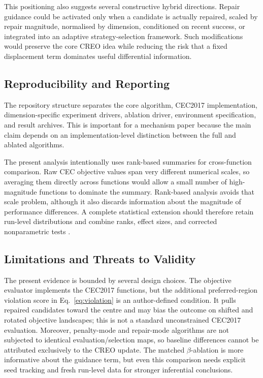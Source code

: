 \documentclass[journal]{IEEEtran}
\begin{document}
This positioning also suggests several constructive hybrid directions. Repair guidance could be activated only when a candidate is actually repaired, scaled by repair magnitude, normalised by dimension, conditioned on recent success, or integrated into an adaptive strategy-selection framework. Such modifications would preserve the core CREO idea while reducing the risk that a fixed displacement term dominates useful differential information.

\subsection{Reproducibility and Reporting}

The repository structure separates the core algorithm, CEC2017 implementation, dimension-specific experiment drivers, ablation driver, environment specification, and result archives. This is important for a mechanism paper because the main claim depends on an implementation-level distinction between the full and ablated algorithms.

The present analysis intentionally uses rank-based summaries for cross-function comparison. Raw CEC objective values span very different numerical scales, so averaging them directly across functions would allow a small number of high-magnitude functions to dominate the summary. Rank-based analysis avoids that scale problem, although it also discards information about the magnitude of performance differences. A complete statistical extension should therefore retain run-level distributions and combine ranks, effect sizes, and corrected nonparametric tests \cite{garcia2009nonparametric,derrac2011tutorial}.

\subsection{Limitations and Threats to Validity}

The present evidence is bounded by several design choices. The objective evaluator implements the CEC2017 functions, but the additional preferred-region violation score in Eq.~\eqref{eq:violation} is an author-defined condition. It pulls repaired candidates toward the centre and may bias the outcome on shifted and rotated objective landscapes; this is not a standard unconstrained CEC2017 evaluation. Moreover, penalty-mode and repair-mode algorithms are not subjected to identical evaluation/selection maps, so baseline differences cannot be attributed exclusively to the CREO update. The matched $\beta$-ablation is more informative about the guidance term, but even this comparison needs explicit seed tracking and fresh run-level data for stronger inferential conclusions.
\end{document}
